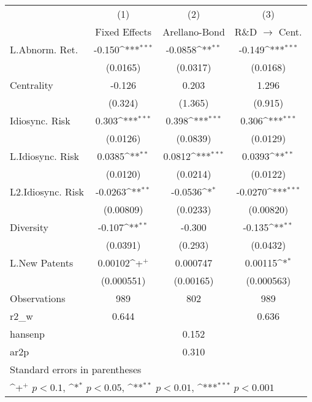 {
\def\sym#1{\ifmmode^{#1}\else\(^{#1}\)\fi}
\begin{tabular}{l*{3}{c}}
\hline\hline
                    &\multicolumn{1}{c}{(1)}&\multicolumn{1}{c}{(2)}&\multicolumn{1}{c}{(3)}\\
                    &\multicolumn{1}{c}{Fixed Effects}&\multicolumn{1}{c}{Arellano-Bond}&\multicolumn{1}{c}{R\&D $\rightarrow$ Cent.}\\
\hline
L.Abnorm. Ret.      &      -0.150\sym{***}&     -0.0858\sym{**} &      -0.149\sym{***}\\
                    &    (0.0165)         &    (0.0317)         &    (0.0168)         \\
Centrality          &      -0.126         &       0.203         &       1.296         \\
                    &     (0.324)         &     (1.365)         &     (0.915)         \\
Idiosync. Risk      &       0.303\sym{***}&       0.398\sym{***}&       0.306\sym{***}\\
                    &    (0.0126)         &    (0.0839)         &    (0.0129)         \\
L.Idiosync. Risk    &      0.0385\sym{**} &      0.0812\sym{***}&      0.0393\sym{**} \\
                    &    (0.0120)         &    (0.0214)         &    (0.0122)         \\
L2.Idiosync. Risk   &     -0.0263\sym{**} &     -0.0536\sym{*}  &     -0.0270\sym{***}\\
                    &   (0.00809)         &    (0.0233)         &   (0.00820)         \\
Diversity           &      -0.107\sym{**} &      -0.300         &      -0.135\sym{**} \\
                    &    (0.0391)         &     (0.293)         &    (0.0432)         \\
L.New Patents       &     0.00102\sym{+}  &    0.000747         &     0.00115\sym{*}  \\
                    &  (0.000551)         &   (0.00165)         &  (0.000563)         \\
\hline
Observations        &         989         &         802         &         989         \\
r2\_w                &       0.644         &                     &       0.636         \\
hansenp             &                     &       0.152         &                     \\
ar2p                &                     &       0.310         &                     \\
\hline\hline
\multicolumn{4}{l}{\footnotesize Standard errors in parentheses}\\
\multicolumn{4}{l}{\footnotesize \sym{+} \(p<0.1\), \sym{*} \(p<0.05\), \sym{**} \(p<0.01\), \sym{***} \(p<0.001\)}\\
\end{tabular}
}
